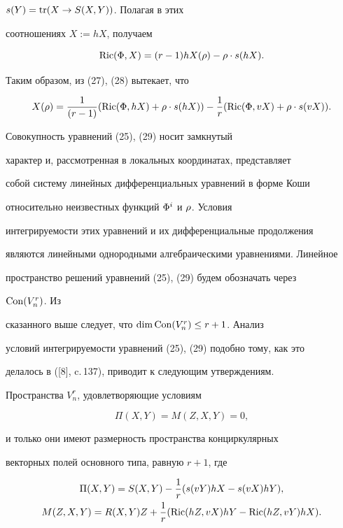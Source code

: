$s(Y)=\operatorname{tr}(X\rightarrow S(X,Y))$. Полагая в этих


соотношениях $X:=hX$, получаем


\begin{equation}


\Ric(\F,X)=(r-1){hX}(\ro) -\ro \cdot s(hX).


\end{equation}


Таким образом, из (27), (28) вытекает, что


\begin{equation}


X(\ro)=\frac 1{(r-1)}(\Ric(\F,hX) + \ro\cdot s(hX)) - \frac


1{r}(\Ric(\F,vX) + \ro\cdot s(vX)).


\end{equation}


Совокупность уравнений (25), (29) носит замкнутый


характер и, рассмотренная в локальных координатах, представляет


собой систему линейных дифференциальных уравнений в форме Коши


относительно неизвестных функций $\Phi^i$ и $\rho$. Условия


интегрируемости этих уравнений и их дифференциальные продолжения


являются линейными однородными алгебраическими уравнениями. Линейное


пространство решений уравнений (25), (29) будем обозначать через


$\operatorname{Con}(V^r_n)$. Из


сказанного выше следует, что $\dim \operatorname{Con}(V^r_n)\le r+1$. Анализ


условий интегрируемости уравнений (25), (29) подобно тому, как это


делалось в ([8], c.\,137), приводит к следующим утверждениям.





\begin{thm}


Пространства $V^r_n$, удовлетворяющие условиям


\begin{equation}


\Pi(X,Y)=M(Z,X,Y)=0,


\end{equation}


и только они имеют размерность пространства конциркулярных


векторных полей основного типа, равную $r+1$, где


\begin{gather*}


\Pi(X,Y)=S(X,Y)-\frac 1{r}(s(vY)hX - s(vX)hY),\\


M(Z,X,Y)=R(X,Y)Z +\frac 1{r}(\Ric(hZ,vX)hY -\Ric(hZ,vY)hX).


\end{gather*}


\end{thm}





